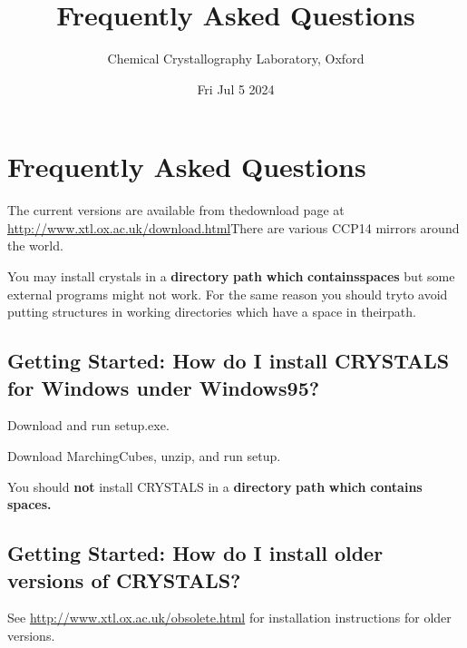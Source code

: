 \documentclass[10pt,a4paper]{report}
\begin{document}
\lhead{\slshape \rightmark}
\chead{}
\rhead{\thepage}
\cfoot{}
\rfoot{}
\renewcommand{\headrulewidth}{0pt}
\renewcommand{\footrulewidth}{0pt}
\fancypagestyle{plain}{%
\fancyhf{}
\fancyfoot[L]{Fri Jul  5  2024}
\fancyfoot[C]{\thepage}
\renewcommand{\headrulewidth}{0pt}
\renewcommand{\footrulewidth}{0pt}}
\newcommand{\Instruction}[1]{{\bf #1}}
\newcommand{\Directive}[1]{{\bf \emph{#1}}}
\newcommand{\Keyword}[1]{\emph{#1}}
\sloppy
\title{Frequently Asked Questions}
\author{Chemical Crystallography Laboratory, Oxford}
\date{Fri Jul  5  2024}
\maketitle
\tableofcontents
\chapter{Frequently Asked Questions}


The current versions are available from thedownload page at \url{http://www.xtl.ox.ac.uk/download.html}There are various CCP14 mirrors around the world.

You may install crystals in a {\bf directory} {\bf path} {\bf which} {\bf contains}{\bf spaces}  but some external programs might not work. For the same reason you should tryto avoid putting structures in working directories which have a space in theirpath.\section{Getting Started: How do I install CRYSTALS for Windows under Windows95?}
  

Download and run setup.exe.





  

Download MarchingCubes, unzip, and run setup.





You should {\bf not} install CRYSTALS in a {\bf directory} {\bf path} {\bf which} {\bf contains}
{\bf spaces.}

\section{Getting Started: How do I install older versions of CRYSTALS?}


See \url{http://www.xtl.ox.ac.uk/obsolete.html} for installation
instructions for older versions.
\end{document}

